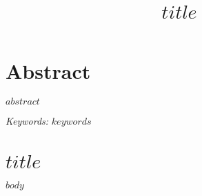 \documentclass[12pt, letterpaper]{article}
\title{ $title$ }
\begin{document}
\section{Abstract}

\noindent $abstract$

\textit{Keywords:} $keywords$

\newpage

\section{$title$}

$body$
\end{document}
